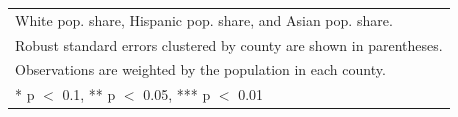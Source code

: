 \documentclass[
  11pt,
]{article}
\begin{document}
\begin{table}[!h]
\begin{tabular}[t]{l>{\centering\arraybackslash}p{1.5in}>{\centering\arraybackslash}p{1.5in}>{\centering\arraybackslash}p{1.5in}}
\multicolumn{4}{l}{\rule{0pt}{1em}White pop. share, Hispanic pop. share, and Asian pop. share.}\\
\multicolumn{4}{l}{\rule{0pt}{1em}Robust standard errors clustered by county are shown in parentheses.}\\
\multicolumn{4}{l}{\rule{0pt}{1em}Observations are weighted by the population in each county.}\\
\multicolumn{4}{l}{\rule{0pt}{1em}* p $<$ 0.1, ** p $<$ 0.05, *** p $<$ 0.01}\\
\end{tabular}
\end{table}
\end{document}
